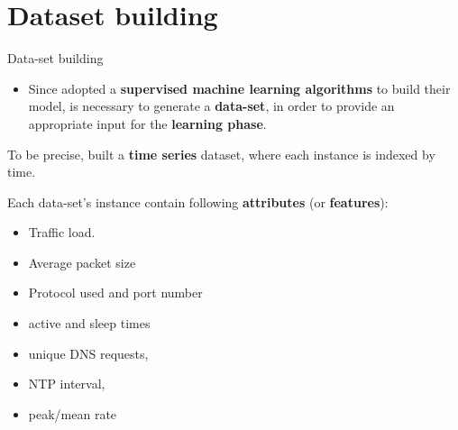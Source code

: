 \documentclass[10pt]{beamer}
\begin{document}
\section{Dataset building}
\begin{frame}{Data-set building}{\justifying}

\begin{itemize}

\item Since \citet{ITPAReport} adopted a \textbf{supervised machine learning algorithms} to build their model, is necessary to generate a \textbf{data-set}, in order to provide an appropriate input for the \textbf{learning phase}.


\end{itemize}

To be precise, \citet{ITPAReport} built a \textbf{time series} dataset, where each instance is indexed by time.

Each data-set's instance contain following \textbf{attributes} (or \textbf{features}):
\begin{itemize}
\item Traffic load.
\item Average packet size
\item Protocol used and port number
\item active and sleep times
\item unique DNS requests, 
\item NTP interval, 
\item peak/mean rate
\end{itemize}

\end{frame} 
\end{document}
